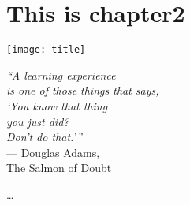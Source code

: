 \chapter{This is chapter2}\label{ch:chapter2}

\begin{minipage}[b]{0.6\textwidth}
    \texttt{[image: title]} %
  \end{minipage}
  \hfill
  \begin{minipage}[b]{0.35\textwidth}
    \footnotesize
    \begin{flushright}
      \textit{``A learning experience\\is one of those things that says,\\`You know that thing\\you just did?\\Don't do that.'\thinspace''} \\
      --- Douglas Adams, \\The Salmon of Doubt
    \end{flushright}
    \vspace{2cm}
  \end{minipage}
  
  \clearpage

\ldots




\cleardoublepage

